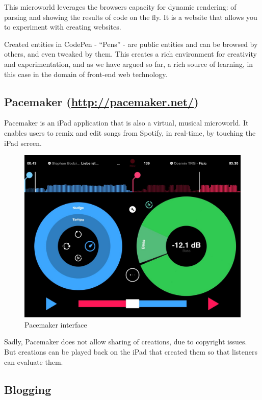 This microworld leverages the browsers capacity for dynamic rendering:
of parsing and showing the results of code on the fly. It is a website that allows
you to experiment with creating websites.

Created entities in CodePen - ``Pens'' - are public entities and can be
browsed by others, and even tweaked by them. This creates a rich
environment for creativity and experimentation, and as we have argued so
far, a rich source of learning, in this case in the domain of front-end
web technology.

\subsection{Pacemaker (\url{http://pacemaker.net/})}

Pacemaker is an iPad application that is also a virtual, musical microworld. It enables users to remix and edit songs from Spotify, in real-time, by touching the iPad screen.

\begin{figure}[ht!]
\centering
\includegraphics[width=123mm]{img/pacemaker.jpg}
\caption{Pacemaker interface}
\label{overflow}
\end{figure}

Sadly, Pacemaker does not allow sharing of creations, due to copyright issues. But creations can be played back on the iPad that created them so that listeners can evaluate them. 

\subsection{Blogging}

